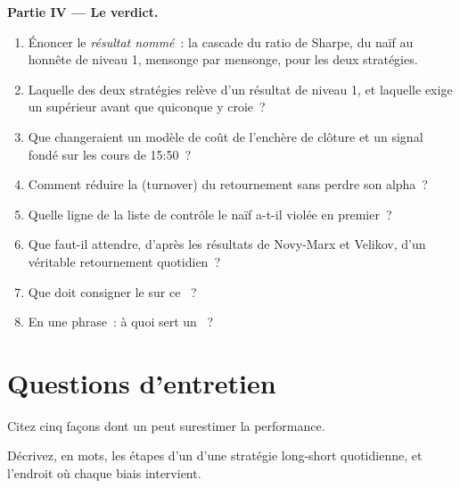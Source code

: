 \begin{problem}
\medskip\noindent\textbf{Partie IV --- Le verdict.}
\begin{enumerate}[resume]
\item Énoncer le \emph{résultat nommé}~: la cascade du ratio de Sharpe, du  naïf au  honnête de niveau 1, mensonge par mensonge, pour les deux stratégies.
\item Laquelle des deux stratégies relève d'un résultat de niveau 1, et laquelle exige un  supérieur avant que quiconque y croie~?
\item Que changeraient un modèle de coût de l'enchère de clôture et un signal fondé sur les cours de 15:50~?
\item Comment réduire la  (turnover) du retournement sans perdre son alpha~?
\item Quelle ligne de la liste de contrôle le  naïf a-t-il violée en premier~?
\item Que faut-il attendre, d'après les résultats de Novy-Marx et Velikov, d'un véritable retournement quotidien~?
\item Que doit consigner le  sur ce ~?
\item En une phrase~: à quoi sert un ~?
\end{enumerate}
\end{problem}

\section{Questions d'entretien}

\begin{interviewq}\label{iq:rs:vectorised-backtests:1}
Citez cinq façons dont un  peut surestimer la performance.
\end{interviewq}

\begin{interviewq}\label{iq:rs:vectorised-backtests:2}
Décrivez, en mots, les étapes d'un  d'une stratégie long-short quotidienne, et l'endroit où chaque biais intervient.
\end{interviewq}

